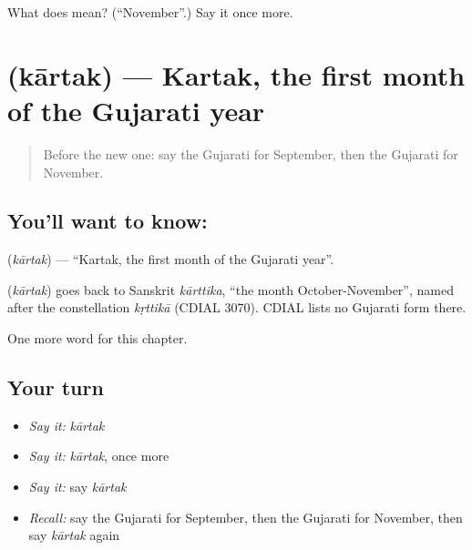 \begin{tcolorbox}[breakable,colback=teal!4,colframe=teal!35!black,title={Before you move on}]
What does  mean? (\textquotedblleft{}November\textquotedblright{}.) Say it once more.
\end{tcolorbox}
\section[\texorpdfstring{\gu{કારતક} (kārtak)}{કારતક (kārtak)}]{ (kārtak) — Kartak, the first month of the Gujarati year}

\label{lesson:GU-C97-kartak}



\begin{quote}
Before the new one: say the Gujarati for September, then the Gujarati for November.
\end{quote}

\subsection*{You'll want to know: }
\textbf{} (\emph{kārtak}) — \textquotedblleft{}Kartak, the first month of the Gujarati year\textquotedblright{}.

\begin{cousinweb}
\textbf{} (\emph{kārtak}) goes back to Sanskrit \emph{kārttika}, \textquotedblleft{}the month October-November\textquotedblright{}, named after the constellation \emph{kṛttikā} (CDIAL 3070). CDIAL lists no Gujarati form there.
\end{cousinweb}

\begin{grammarlens}[title={What you've built}]
One more word for this chapter.
\end{grammarlens}

\subsection*{Your turn}
\begin{itemize}
\raggedright
  \item \emph{Say it:} \emph{kārtak}
  \item \emph{Say it:} \emph{kārtak}, once more
  \item \emph{Say it:} say \emph{kārtak}
  \item \emph{Recall:} say the Gujarati for September, then the Gujarati for November, then say \emph{kārtak} again
\end{itemize}

